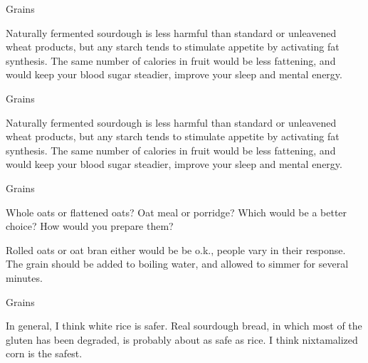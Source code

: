 \documentclass[11pt,oneside,openany,extrafontsizes]{memoir}
\begin{document}
\begin{standalonequote}{Grains}

    \begin{answer}
        Naturally fermented sourdough is less harmful than standard or unleavened wheat products, but any starch tends to stimulate appetite by activating fat synthesis. The same number of calories in fruit would be less fattening, and would keep your blood sugar steadier, improve your sleep and mental energy.
    \end{answer}
\end{standalonequote}

\begin{standalonequote}{Grains}

    \begin{answer}
        Naturally fermented sourdough is less harmful than standard or unleavened wheat products, but any starch tends to stimulate appetite by activating fat synthesis. The same number of calories in fruit would be less fattening, and would keep your blood sugar steadier, improve your sleep and mental energy.
    \end{answer}
\end{standalonequote}

\begin{qaexchange}{Grains}

    \begin{question}
        Whole oats or flattened oats? Oat meal or porridge? Which would be a better choice? How would you prepare them?
    \end{question}

    \begin{answer}
       Rolled oats or oat bran either would be be o.k., people vary in their response. The grain should be added to boiling water, and allowed to simmer for several minutes.
    \end{answer}
\end{qaexchange}

\begin{standalonequote}{Grains}

    \begin{answer}
       In general, I think white rice is safer. Real sourdough bread, in which most of the gluten has been degraded, is probably about as safe as rice. I think nixtamalized corn is the safest. 
    \end{answer}
\end{standalonequote}
\end{document}
